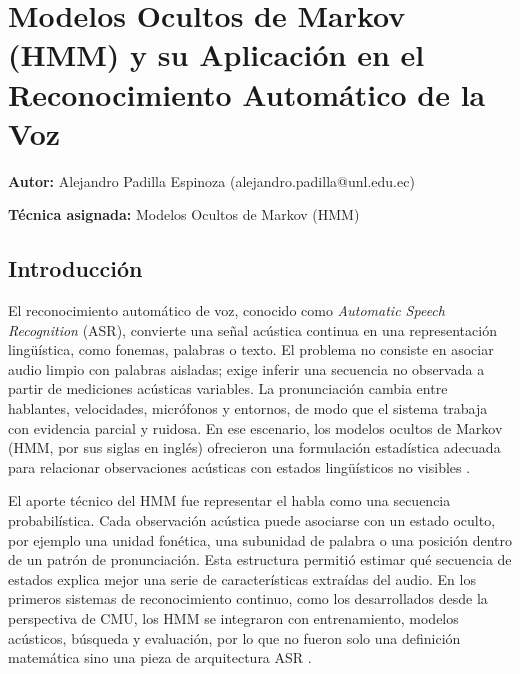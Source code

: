 
\chapter{Modelos Ocultos de Markov (HMM) y su Aplicación en el Reconocimiento Automático de la Voz}
\label{cap:capitulo_21}

\noindent\textbf{Autor:} Alejandro Padilla Espinoza (alejandro.padilla@unl.edu.ec)\par
\noindent\textbf{Técnica asignada:} Modelos Ocultos de Markov (HMM)\par


\section{Introducción}
El reconocimiento automático de voz, conocido como \emph{Automatic Speech Recognition} (ASR), convierte una señal acústica continua en una representación lingüística, como fonemas, palabras o texto. El problema no consiste en asociar audio limpio con palabras aisladas; exige inferir una secuencia no observada a partir de mediciones acústicas variables. La pronunciación cambia entre hablantes, velocidades, micrófonos y entornos, de modo que el sistema trabaja con evidencia parcial y ruidosa. En ese escenario, los modelos ocultos de Markov (HMM, por sus siglas en inglés) ofrecieron una formulación estadística adecuada para relacionar observaciones acústicas con estados lingüísticos no visibles \cite{Rabiner1989TutoriHidden,Juang1991HiddenMarkov}.

El aporte técnico del HMM fue representar el habla como una secuencia probabilística. Cada observación acústica puede asociarse con un estado oculto, por ejemplo una unidad fonética, una subunidad de palabra o una posición dentro de un patrón de pronunciación. Esta estructura permitió estimar qué secuencia de estados explica mejor una serie de características extraídas del audio. En los primeros sistemas de reconocimiento continuo, como los desarrollados desde la perspectiva de CMU, los HMM se integraron con entrenamiento, modelos acústicos, búsqueda y evaluación, por lo que no fueron solo una definición matemática sino una pieza de arquitectura ASR \cite{Lee1990SpeechRecogn}.

